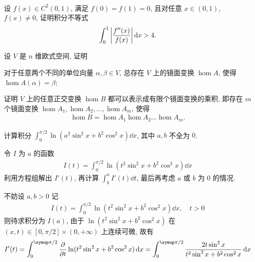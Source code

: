 \begin{exercise}[resume=exer]
\begin{align*}
        \end{align*}
        \sitem 设 $ f(x) \in C^{2}(0, 1) $, 满足 $ f(0) = f(1) = 0 $, 且对任意 $ x\in (0, 1) $, $ f(x) \ne 0 $, 证明积分不等式
        \begin{align*}
            \int_{0}^{1} \abs{\frac{f''(x)}{f(x)}} \dd{x} > 4.
        \end{align*}
        \item 设 $ V $ 是 $ n $ 维欧式空间, 证明
        \begin{exercise}
            \item 对于任意两个不同的单位向量 $ \alpha, \beta \in V $, 总存在 $ V $ 上的镜面变换 $ \hom{A} $, 使得 $ \hom{A}(\alpha) = \beta $;
            \item 证明 $ V $ 上的任意正交变换 $ \hom{B} $ 都可以表示成有限个镜面变换的乘积, 即存在 $ m $ 个镜面变换 $ \hom{A}_{1}, \hom{A}_{2}, \dots, \hom{A}_{m} $, 使得
            \begin{align*}
                \hom{B} = \hom{A}_{1}\hom{A}_{2}\dots\hom{A}_{m}.
            \end{align*}
        \end{exercise}
        \item 计算积分 $ \int_{0}^{\pi/2} \ln (a^{2}\sin^{2}x + b^{2}\cos^{2}x) \dd{x} $, 其中 $ a, b $ 不全为 $ 0 $.
        \begin{hint}
            令 $ I $ 为 $ a $ 的函数
            \begin{align*}
                I(t) = \int_{0}^{\pi/2} \ln (t^{2}\sin^{2}x + b^{2}\cos^{2}x) \dd{x}
            \end{align*}
            利用方程组解出 $ I'(t) $, 再计算 $ \int_{b}^{a} I'(t) \dd{t} $, 最后再考虑 $ a $ 或 $ b $ 为 $ 0 $ 的情况. 
        \end{hint}
        \begin{answer}
            不妨设 $ a, b > 0 $ 记
            \begin{align*}
                I(t) = \int_{0}^{\pi/2} \ln (t^{2}\sin^{2}x + b^{2}\cos^{2}x) \dd{x}, \quad t > 0
            \end{align*}
            则待求积分为 $ I(a) $, 由于 $ \ln (t^{2}\sin^{2}x + b^{2}\cos^{2}x) $ 在 $ (x, t) \in [0, \pi/2]\times(0, +\infty) $ 上连续可微, 故有
            \begin{align*}
                I'(t) = \int_{0}^{\pi/2} \pdv{t}\ln (t^{2}\sin^{2}x + b^{2}\cos^{2}x) \dd{x} = \int_{0}^{\pi/2} \frac{2t\sin^{2}x}{t^{2}\sin^{2}x + b^{2}\cos^{2}x} \dd{x}
            \end{align*}

\end{answer}
\end{exercise}

